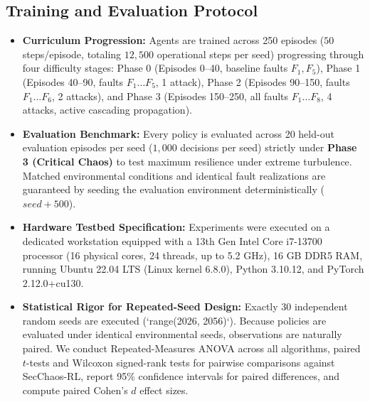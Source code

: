 \documentclass[ASNA,twocolumn]{USG}
\begin{document}
\subsection{Training and Evaluation Protocol}
\begin{itemize}
    \item \textbf{Curriculum Progression:} Agents are trained across 250 episodes ($50$ steps/episode, totaling $12,500$ operational steps per seed) progressing through four difficulty stages: Phase 0 (Episodes 0–40, baseline faults $F_1, F_5$), Phase 1 (Episodes 40–90, faults $F_1 \dots F_5$, 1 attack), Phase 2 (Episodes 90–150, faults $F_1 \dots F_6$, 2 attacks), and Phase 3 (Episodes 150–250, all faults $F_1 \dots F_8$, 4 attacks, active cascading propagation).
    \item \textbf{Evaluation Benchmark:} Every policy is evaluated across 20 held-out evaluation episodes per seed ($1,000$ decisions per seed) strictly under \textbf{Phase 3 (Critical Chaos)} to test maximum resilience under extreme turbulence. Matched environmental conditions and identical fault realizations are guaranteed by seeding the evaluation environment deterministically ($seed + 500$).
    \item \textbf{Hardware Testbed Specification:} Experiments were executed on a dedicated workstation equipped with a 13th Gen Intel Core i7-13700 processor (16 physical cores, 24 threads, up to 5.2 GHz), 16 GB DDR5 RAM, running Ubuntu 22.04 LTS (Linux kernel 6.8.0), Python 3.10.12, and PyTorch 2.12.0+cu130.
    \item \textbf{Statistical Rigor for Repeated-Seed Design:} Exactly 30 independent random seeds are executed (`range(2026, 2056)`). Because policies are evaluated under identical environmental seeds, observations are naturally paired. We conduct Repeated-Measures ANOVA across all algorithms, paired $t$-tests and Wilcoxon signed-rank tests for pairwise comparisons against SecChaos-RL, report 95\% confidence intervals for paired differences, and compute paired Cohen's $d$ effect sizes.
\end{itemize}
\end{document}
